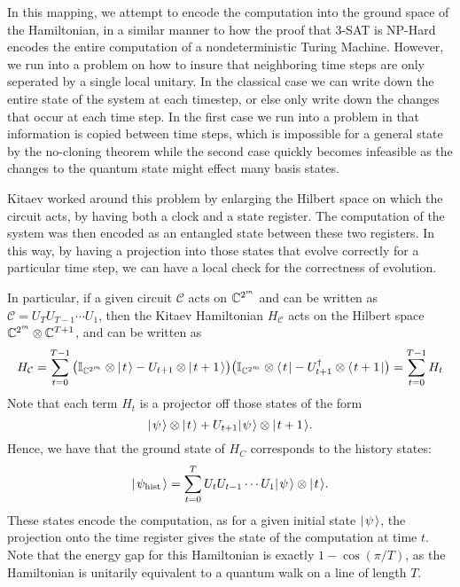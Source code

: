 \documentclass[../thesis-main/thesis-main]{subfiles}
\begin{document}
In this mapping, we attempt to encode the computation into the ground space of the Hamiltonian, in a similar manner to how the proof that 3-SAT is NP-Hard encodes the entire computation of a nondeterministic Turing Machine.
However, we run into a problem on how to insure that neighboring time steps are only seperated by a single local unitary.  In the classical case we can write down the entire state of the system at each timestep, or else only write down the changes that occur at each time step.  In the first case we run into a problem in that information is copied between time steps, which is impossible for a general state by the no-cloning theorem
while the second case quickly becomes infeasible as the changes to the quantum state might effect many basis states.

Kitaev worked around this problem by enlarging the Hilbert space on which the circuit acts, by having both a clock and a state register.  The computation of the system was then encoded as an entangled state between these two registers.  In this way, by having a projection into those states that evolve correctly for a particular time step, we can have a local check for the correctness of evolution.

In particular, if a given circuit $\mathcal{C}$ acts on $\mathbb{C}^{2^m}$ and can be written as $\mathcal{C} = U_{T}U_{T-1} \cdots U_1$, then the Kitaev Hamiltonian $H_\mathcal{C}$ acts on the Hilbert space $\mathbb{C}^{2^m}\otimes \mathbb{C}^{T+1}$, and can be written as
\begin{equation}
  H_\mathcal{C} = \sum_{t=0}^{T-1} \big(\mathbb{I}_{\mathbb{C}^{2^m}}\otimes |\mspace{2mu} t \mspace{2mu} \rangle - U_{t+1} \otimes |\mspace{2mu} t+1 \mspace{2mu} \rangle\big) \big(\mathbb{I}_{\mathbb{C}^{2^m}}\otimes \langle\mspace{2mu} t \mspace{2mu} | - U_{t+1}^\dag \otimes \langle\mspace{2mu} t+1 \mspace{2mu} |\big) = \sum_{t=0}^{T-1} H_t
\end{equation}
Note that each term $H_t$ is a projector off those states of the form
\begin{equation}
  |\mspace{2mu} \psi \mspace{2mu} \rangle \otimes |\mspace{2mu} t \mspace{2mu} \rangle + U_{t+1} |\mspace{2mu} \psi \mspace{2mu} \rangle \otimes |\mspace{2mu} t+1 \mspace{2mu} \rangle.
\end{equation}
Hence, we have that the ground state of $H_C$ corresponds to the history states:
\begin{equation}
  |\mspace{2mu} \psi_\text{hist} \mspace{2mu} \rangle = \sum_{t=0}^T U_t U_{t-1} \cdots U_1 |\mspace{2mu} \psi \mspace{2mu} \rangle \otimes |\mspace{2mu} t \mspace{2mu} \rangle.
\end{equation}
These states encode the computation, as for a given initial state $|\mspace{2mu} \psi \mspace{2mu} \rangle$, the projection onto the time register gives the state of the computation at time $t$.  Note that the energy gap for this Hamiltonian is exactly $1 - \cos(\pi/T)$, as the Hamiltonian is unitarily equivalent to a quantum walk on a line of length $T$.
\end{document}
